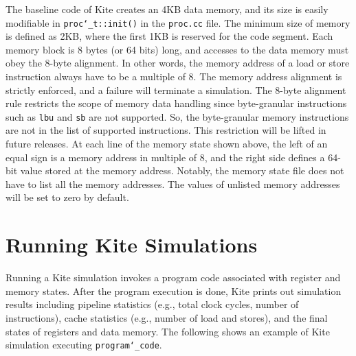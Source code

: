 \documentclass[10pt]{article}
\begin{document}
The baseline code of Kite creates an 4KB data memory, and its size is easily modifiable in {\tt proc\char`_t::init()} in the {\tt proc.cc} file.
The minimum size of memory is defined as 2KB, where the first 1KB is reserved for the code segment.
Each memory block is 8 bytes (or 64 bits) long, and accesses to the data memory must obey the 8-byte alignment.
In other words, the memory address of a load or store instruction always have to be a multiple of 8.
The memory address alignment is strictly enforced, and a failure will terminate a simulation.
The 8-byte alignment rule restricts the scope of memory data handling since byte-granular instructions such as {\tt lbu} and {\tt sb} are not supported.
So, the byte-granular memory instructions are not in the list of supported instructions.
This restriction will be lifted in future releases.
At each line of the memory state shown above, the left of an equal sign is a memory address in multiple of 8, and the right side defines a 64-bit value stored at the memory address.
Notably, the memory state file does not have to list all the memory addresses.
The values of unlisted memory addresses will be set to zero by default.


\section{Running Kite Simulations} \label{sec:running}
Running a Kite simulation invokes a program code associated with register and memory states.
After the program execution is done, Kite prints out simulation results including pipeline statistics (e.g., total clock cycles, number of instructions), cache statistics (e.g., number of load and stores), and the final states of registers and data memory.
The following shows an example of Kite simulation executing {\tt program\char`_code}.
\end{document}
